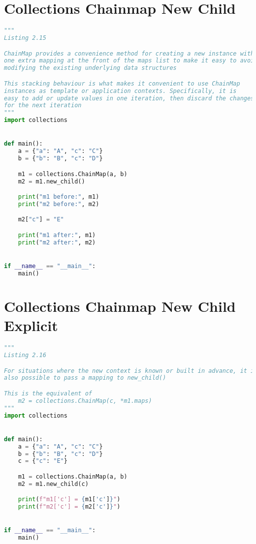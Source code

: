 \documentclass[a4paper,landscape]{report}
\begin{document}
\section{Collections Chainmap New Child}
\begin{lstlisting}[language=Python]
"""
Listing 2.15

ChainMap provides a convenience method for creating a new instance with
one extra mapping at the front of the maps list to make it easy to avoid
modifying the existing underlying data structures

This stacking behaviour is what makes it convenient to use ChainMap
instances as template or application contexts. Specifically, it is
easy to add or update values in one iteration, then discard the changes
for the next iteration
"""
import collections


def main():
    a = {"a": "A", "c": "C"}
    b = {"b": "B", "c": "D"}

    m1 = collections.ChainMap(a, b)
    m2 = m1.new_child()

    print("m1 before:", m1)
    print("m2 before:", m2)

    m2["c"] = "E"

    print("m1 after:", m1)
    print("m2 after:", m2)


if __name__ == "__main__":
    main()

\end{lstlisting}
\section{Collections Chainmap New Child Explicit}
\begin{lstlisting}[language=Python]
"""
Listing 2.16

For situations where the new context is known or built in advance, it is
also possible to pass a mapping to new_child()

This is the equivalent of
    m2 = collections.ChainMap(c, *m1.maps)
"""
import collections


def main():
    a = {"a": "A", "c": "C"}
    b = {"b": "B", "c": "D"}
    c = {"c": "E"}

    m1 = collections.ChainMap(a, b)
    m2 = m1.new_child(c)

    print(f"m1['c'] = {m1['c']}")
    print(f"m2['c'] = {m2['c']}")


if __name__ == "__main__":
    main()

\end{lstlisting}
\end{document}
